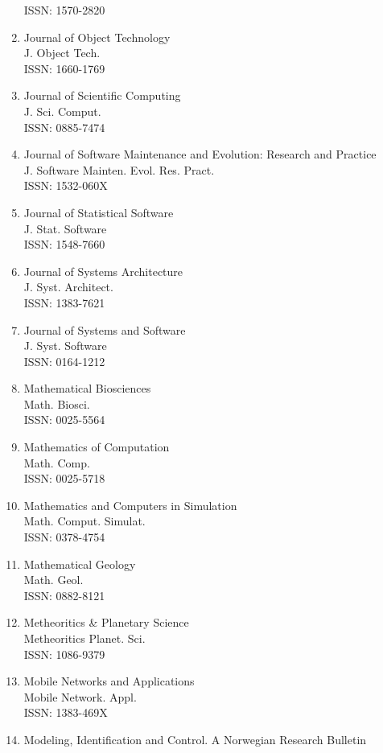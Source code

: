 \begin{enumerate}
 ISSN: 1570-2820
\item
 Journal of Object Technology\\
 J. Object Tech.\\
 ISSN: 1660-1769
\item
 Journal of Scientific Computing\\
 J. Sci. Comput.\\
 ISSN: 0885-7474
\item
 Journal of Software Maintenance and Evolution: Research and Practice\\
 J. Software Mainten. Evol. Res. Pract.\\
 ISSN: 1532-060X
\item
 Journal of Statistical Software\\
 J. Stat. Software\\
 ISSN: 1548-7660
\item
 Journal of Systems Architecture\\
 J. Syst. Architect.\\
 ISSN: 1383-7621
\item
 Journal of Systems and Software\\
 J. Syst. Software\\
 ISSN: 0164-1212
\item
 Mathematical Biosciences\\
 Math. Biosci.\\
 ISSN: 0025-5564
\item
 Mathematics of Computation\\
 Math. Comp.\\
 ISSN: 0025-5718
\item
 Mathematics and Computers in Simulation\\
 Math. Comput. Simulat.\\
 ISSN: 0378-4754
\item
 Mathematical Geology\\
 Math. Geol.\\
 ISSN: 0882-8121
\item
 Metheoritics \& Planetary Science\\
 Metheoritics Planet. Sci.\\
 ISSN: 1086-9379
\item
 Mobile Networks and Applications\\
 Mobile Network. Appl.\\
 ISSN: 1383-469X
\item
 Modeling, Identification and Control. A Norwegian Research Bulletin\\

\end{enumerate}

